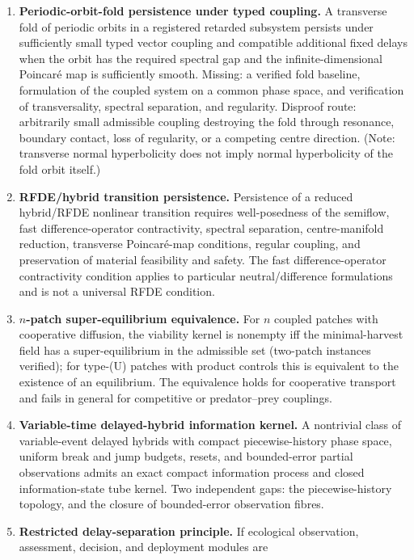 \documentclass[
  10pt,
  a4paper,
]{article}
\begin{document}
\begin{enumerate}
\def\labelenumi{\arabic{enumi}.}
\item
  \textbf{Periodic-orbit-fold persistence under typed coupling.} A
  transverse fold of periodic orbits in a registered retarded subsystem
  persists under sufficiently small typed vector coupling and compatible
  additional fixed delays when the orbit has the required spectral gap
  and the infinite-dimensional Poincaré map is sufficiently smooth.
  Missing: a verified fold baseline, formulation of the coupled system
  on a common phase space, and verification of transversality, spectral
  separation, and regularity. Disproof route: arbitrarily small
  admissible coupling destroying the fold through resonance, boundary
  contact, loss of regularity, or a competing centre direction. (Note:
  transverse normal hyperbolicity does not imply normal hyperbolicity of
  the fold orbit itself.)
\item
  \textbf{RFDE/hybrid transition persistence.} Persistence of a reduced
  hybrid/RFDE nonlinear transition requires well-posedness of the
  semiflow, fast difference-operator contractivity, spectral separation,
  centre-manifold reduction, transverse Poincaré-map conditions, regular
  coupling, and preservation of material feasibility and safety. The
  fast difference-operator contractivity condition applies to particular
  neutral/difference formulations and is not a universal RFDE condition.
\item
  \textbf{\(n\)-patch super-equilibrium equivalence.} For \(n\) coupled
  patches with cooperative diffusion, the viability kernel is nonempty
  iff the minimal-harvest field has a super-equilibrium in the
  admissible set (two-patch instances verified); for type-(U) patches
  with product controls this is equivalent to the existence of an
  equilibrium. The equivalence holds for cooperative transport and fails
  in general for competitive or predator--prey couplings.
\item
  \textbf{Variable-time delayed-hybrid information kernel.} A nontrivial
  class of variable-event delayed hybrids with compact piecewise-history
  phase space, uniform break and jump budgets, resets, and bounded-error
  partial observations admits an exact compact information process and
  closed information-state tube kernel. Two independent gaps: the
  piecewise-history topology, and the closure of bounded-error
  observation fibres.
\item
  \textbf{Restricted delay-separation principle.} If ecological
  observation, assessment, decision, and deployment modules are

\end{enumerate}
\end{document}
